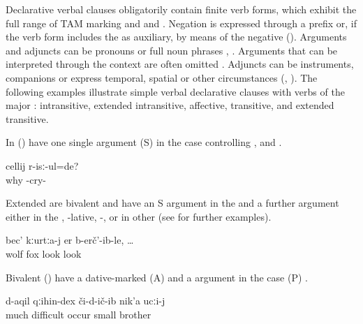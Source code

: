 Declarative verbal clauses obligatorily contain finite verb forms, which exhibit the full range of TAM marking and  and . Negation is expressed through a prefix or, if the verb form includes the  as auxiliary, by means of the negative  (). Arguments and adjuncts can be pronouns or full noun phrases , . Arguments that can be interpreted through the context are often omitted . Adjuncts can be instruments, companions or express temporal, spatial or other circumstances (, ). The following examples illustrate simple verbal declarative clauses with verbs of the major : intransitive, extended intransitive, affective, transitive, and extended transitive. 

In () have one single argument (S) in the  case controlling ,  and  .

\begin{exe}
	\ex	\label{ex:She is crying.Why}
	\gll	cellij r-isː-ul=de?	\\
		why -cry- 	\\
	\glt	{}
\end{exe}

Extended  are bivalent and have an S argument in the  and a further argument either in the , -lative, -, or in other   (see  for further examples).
%
\begin{exe}
	\ex	\label{ex:The wolf looked at the fox}
	\gll	bec'	kːurtːa-j er	b-erč'-ib-le, \ldots	\\
		wolf	fox look	look	\\
	\glt	{}
\end{exe}

Bivalent  () have a dative-marked  (A) and a  argument in the  case (P) .
%
\begin{exe}
	\ex	\label{ex:‎‎‎The little brother experienced many difficulties}
	\gll	d-aqil	qːihin-dex	či-d-ič-ib	nik'a	ucːi-j\\
		much	difficult	occur	small	brother\\
	\glt	{}
\end{exe}

